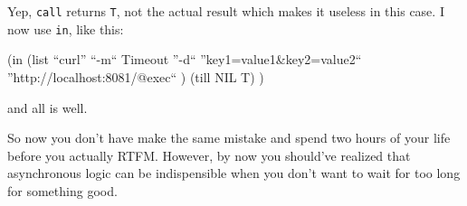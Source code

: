 Yep, \texttt{call} returns \texttt{T}, not the actual result which
makes it useless in this case. I now use \texttt{in}, like this: 

\begin{wideverbatim}
(in (list ``curl'' ``-m`` Timeout ''-d`` ''key1=value1\&key2=value2``
       ''http://localhost:8081/@exec`` ) (till NIL T) ) 
\end{wideverbatim}

and all is well.

So now you don't have make the same mistake and spend two hours of
your life before you actually RTFM. However, by now you should've
realized that asynchronous logic can be indispensible when you don't
want to wait for too long for something good.


